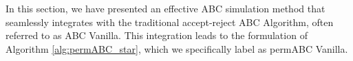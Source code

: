 \documentclass[lineno]{biometrika}
\DeclareMathOperator*{\argmin}{arg\,min}
\def\Clust{K}
\def\iperm{l}
\def\istrat{h}
\def\Npermstrat#1{L_{#1}}
\def\Nstrat{H}
\def\obsdata{\mathbf{y}}
\def\parprop{\boldsymbol{\theta}}
\def\simdata{\mathbf{z}}
\def\Varstrat{N}
\begin{document}

In this section, we have presented an effective ABC simulation method that seamlessly integrates with the traditional accept-reject ABC Algorithm, often referred to as ABC Vanilla. This integration leads to the formulation of Algorithm \ref{alg:permABC_star}, which we specifically label as permABC Vanilla.



\end{document}
